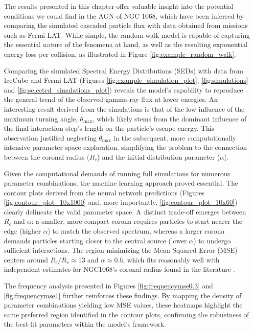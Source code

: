 The results presented in this chapter offer valuable insight into the potential conditions we could find in the AGN of NGC 1068, which have been inferred by comparing the simulated cascaded particle flux with data obtained from missions such as Fermi-LAT. While simple, the random walk model is capable of capturing the essential nature of the fenomena at hand, as well as the resulting exponential energy loss per collision, as illustrated in Figure \ref{fig:example_random_walk}. 

Comparing the simulated Spectral Energy Distributions (SEDs) with data from IceCube and Fermi-LAT (Figures \ref{fig:example_simulation_plot}, \ref{fig:simulations} and \ref{fig:selected_simulations_plot}) reveals the model's capability to reproduce the general trend of the observed gamma-ray flux at lower energies. An interesting result derived from the simulations is that of the low influence of the maximum turning angle, $\theta_{\max}$, which likely stems from the dominant influence of the final interaction step's length on the particle's escape energy. This observation justified neglecting $\theta_{\max}$ in the subsequent, more computationally intensive parameter space exploration, simplifying the problem to the connection between the coronal radius ($R_c$) and the initial distribution parameter ($\alpha$).

Given the computational demands of running full simulations for numerous parameter combinations, the machine learning approach proved essential. The contour plots derived from the neural network predictions (Figures \ref{fig:contour_plot_10x1000} and, more importantly, \ref{fig:contour_plot_10x60}) clearly delineate the valid parameter space. A distinct trade-off emerges between $R_c$ and $\alpha$: a smaller, more compact corona requires particles to start nearer the edge (higher $\alpha$) to match the observed spectrum, whereas a larger corona demands particles starting closer to the central source (lower $\alpha$) to undergo sufficient interactions. The region minimizing the Mean Squared Error (MSE) centers around $R_c/R_s \approx 13$ and $\alpha \approx 0.6$, which fits reasonably well with independent estimates for NGC1068's coronal radius found in the literature \citep{Eichmann_2022}.

The frequency analysis presented in Figures \ref{fig:frequencymse0.3} and \ref{fig:frequencymse1} further reinforces these findings. By mapping the density of parameter combinations yielding low MSE values, these heatmaps highlight the same preferred region identified in the contour plots, confirming the robustness of the best-fit parameters within the model's framework.


